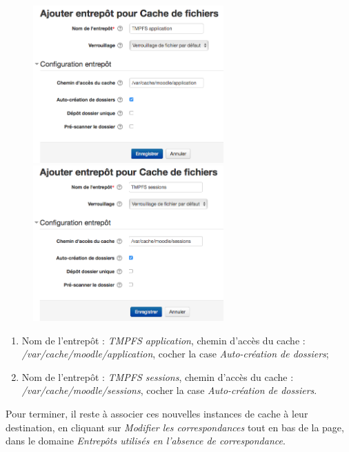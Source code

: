 \documentclass[11pt]{article}
\begin{document}
\begin{figure}[!ht]
\begin{minipage}[b]{0.45\linewidth} %
\centering
\includegraphics[width=7.3cm]{cache-application.png}
\end{minipage}
\hspace{\fill} %
\begin{minipage}[b]{0.45\linewidth}
\centering
\includegraphics[width=7.3cm]{cache-sessions.png}
\end{minipage}
\end{figure}

\begin{enumerate}
\item Nom de l'entrepôt : \emph{TMPFS application}, chemin d'accès du cache : \emph{/var/cache/moodle/application}, cocher la case \emph{Auto-création de dossiers};
\item Nom de l'entrepôt : \emph{TMPFS sessions}, chemin d'accès du cache : \emph{/var/cache/moodle/sessions}, cocher la case \emph{Auto-création de dossiers}.
\end{enumerate}

Pour terminer, il reste à associer ces nouvelles instances de cache à leur destination, en cliquant sur \emph{Modifier les correspondances} tout en bas de la page, dans le domaine \emph{Entrepôts utilisés en l'absence de correspondance}.
\end{document}
